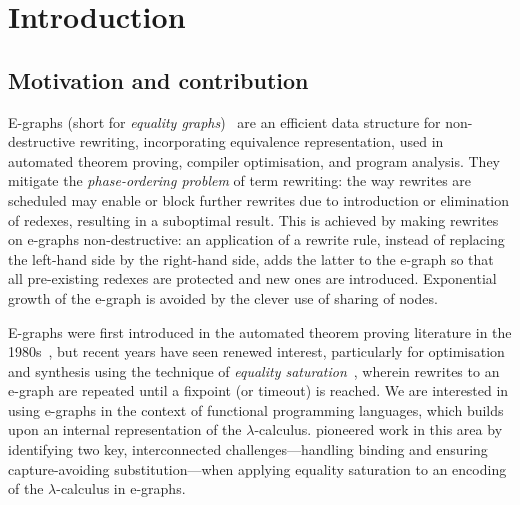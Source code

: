 \section{Introduction}%
\label{sec:introduction}

\subsection{Motivation and contribution}

E-graphs (short for \emph{equality graphs})~\cite{EggPaper} are an efficient data structure for non-destructive rewriting, incorporating equivalence representation, used in automated theorem proving, compiler optimisation, and program analysis.
They mitigate the \emph{phase-ordering problem} of term rewriting: the way rewrites are scheduled may enable or block further rewrites due to introduction or elimination of redexes, resulting in a suboptimal result.
This is achieved by making rewrites on e-graphs non-destructive: an application of a rewrite rule, instead of replacing the left-hand side by the right-hand side, adds the latter to the e-graph so that all pre-existing redexes are protected and new ones are introduced.
Exponential growth of the e-graph is avoided by the clever use of sharing of nodes.

E-graphs were first introduced in the automated theorem proving literature in the 1980s~\cite{nelson1980techniques}, but recent years have seen renewed interest, particularly for optimisation and synthesis using the technique of \emph{equality saturation}~\cite{EqualitySaturation2009,EggPaper,flatt_small_2022}, wherein rewrites to an e-graph are repeated until a fixpoint (or timeout) is reached.
We are interested in using e-graphs in the context of functional programming languages, which builds upon an internal representation of the $\lambda$-calculus.
\citet{koehler2022sketchguided} pioneered work in this area by identifying two key, interconnected challenges—handling binding and ensuring capture-avoiding substitution—when applying equality saturation to an encoding of the $\lambda$-calculus in e-graphs.

